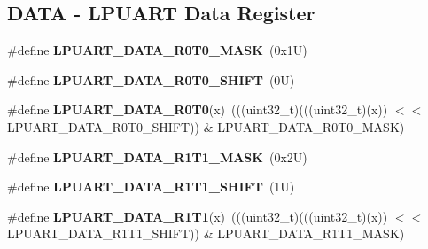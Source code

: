 \subsection*{D\+A\+TA -\/ L\+P\+U\+A\+RT Data Register}
\begin{DoxyCompactItemize}
\item 
\mbox{\label{group___l_p_u_a_r_t___register___masks_gaa43b1d3743dd2820a33775e5f831854f}} 
\#define {\bfseries L\+P\+U\+A\+R\+T\+\_\+\+D\+A\+T\+A\+\_\+\+R0\+T0\+\_\+\+M\+A\+SK}~(0x1\+U)
\item 
\mbox{\label{group___l_p_u_a_r_t___register___masks_gada55d788a0065f9e5c14ae018b0adca2}} 
\#define {\bfseries L\+P\+U\+A\+R\+T\+\_\+\+D\+A\+T\+A\+\_\+\+R0\+T0\+\_\+\+S\+H\+I\+FT}~(0\+U)
\item 
\mbox{\label{group___l_p_u_a_r_t___register___masks_ga3ce2f76ccd3d72635a7cf952b2804152}} 
\#define {\bfseries L\+P\+U\+A\+R\+T\+\_\+\+D\+A\+T\+A\+\_\+\+R0\+T0}(x)~(((uint32\+\_\+t)(((uint32\+\_\+t)(x)) $<$$<$ L\+P\+U\+A\+R\+T\+\_\+\+D\+A\+T\+A\+\_\+\+R0\+T0\+\_\+\+S\+H\+I\+FT)) \& L\+P\+U\+A\+R\+T\+\_\+\+D\+A\+T\+A\+\_\+\+R0\+T0\+\_\+\+M\+A\+SK)
\item 
\mbox{\label{group___l_p_u_a_r_t___register___masks_ga49c0c8d83f84c336663d18cb6dc72e9b}} 
\#define {\bfseries L\+P\+U\+A\+R\+T\+\_\+\+D\+A\+T\+A\+\_\+\+R1\+T1\+\_\+\+M\+A\+SK}~(0x2\+U)
\item 
\mbox{\label{group___l_p_u_a_r_t___register___masks_ga0d8cfa9fac4326883e220d043c580be1}} 
\#define {\bfseries L\+P\+U\+A\+R\+T\+\_\+\+D\+A\+T\+A\+\_\+\+R1\+T1\+\_\+\+S\+H\+I\+FT}~(1\+U)
\item 
\mbox{\label{group___l_p_u_a_r_t___register___masks_ga257b84946e94ec1b2f058563c6052817}} 
\#define {\bfseries L\+P\+U\+A\+R\+T\+\_\+\+D\+A\+T\+A\+\_\+\+R1\+T1}(x)~(((uint32\+\_\+t)(((uint32\+\_\+t)(x)) $<$$<$ L\+P\+U\+A\+R\+T\+\_\+\+D\+A\+T\+A\+\_\+\+R1\+T1\+\_\+\+S\+H\+I\+FT)) \& L\+P\+U\+A\+R\+T\+\_\+\+D\+A\+T\+A\+\_\+\+R1\+T1\+\_\+\+M\+A\+SK)
\item 
\mbox{\label{group___l_p_u_a_r_t___register___masks_gaf85fbef712b638c71a74a236f98ba5ae}} 

\end{DoxyCompactItemize}
